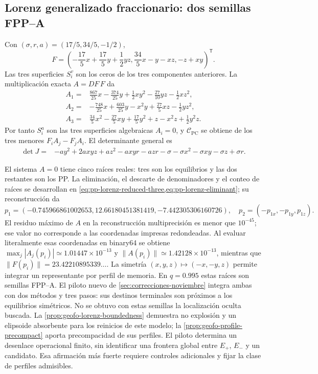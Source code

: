 \subsection{Lorenz generalizado fraccionario: dos semillas FPP--A}
\label{subsec:casegt-lorenz}

Con $(\sigma,r,a)=(17/5,34/5,-1/2)$,
\begin{equation}
 F=\left(
 -\frac{17}{5}x+\frac{17}{5}y+\frac12yz,
 \frac{34}{5}x-y-xz,
 -z+xy
 \right)^{\mathsf T}.
 \label{casegt:eq:lorenz-field}
\end{equation}
Las tres superficies $S_i^v$ son los ceros de los tres componentes anteriores.
La multiplicación exacta $A=DF\,F$ da
\begin{align}
 A_1={}&\frac{867}{25}x-\frac{374}{25}y+\frac{1}{2}xy^2
 -\frac{27}{10}yz-\frac12xz^2,\nonumber\\
 A_2={}&-\frac{748}{25}x+\frac{603}{25}y-x^2y
 +\frac{27}{5}xz-\frac12yz^2,\\
 A_3={}&\frac{34}{5}x^2-\frac{27}{5}xy+\frac{17}{5}y^2
 +z-x^2z+\frac12y^2z.
 \label{casegt:eq:lorenz-A}
\end{align}
Por tanto $S_i^a$ son las tres superficies algebraicas
$A_i=0$, y $\mathcal C_{\mathrm{PC}}$ se obtiene de los tres menores
$F_iA_j-F_jA_i$. El determinante general es
\begin{align}
 \det J={}&-ay^2+2axyz+az^2-axyr-azr-\sigma
 -\sigma x^2-\sigma xy-\sigma z+\sigma r.
 \label{casegt:eq:lorenz-det}
\end{align}

El sistema $A=0$ tiene cinco raíces reales: tres son los equilibrios y las dos restantes
son los PP. La eliminación, el descarte de denominadores y el conteo de
raíces se desarrollan en \cref{eq:pp-lorenz-reduced-three,eq:pp-lorenz-eliminant};
su reconstrucción da
\begin{equation}
 p_1=(-0.745966861002653,12.66180451381419,-7.442305306160726),
 \quad
 p_2=(-p_{1x},-p_{1y},p_{1z}).
 \label{casegt:eq:lorenz-PP}
\end{equation}
El residuo máximo de $A$ en la reconstrucción multiprecisión es menor que
$10^{-45}$; ese valor no corresponde a las coordenadas impresas redondeadas.
Al evaluar literalmente esas coordenadas en binary64 se obtiene
$\max_j|A_j(p_i)|\simeq1.01447\times10^{-13}$ y
$\lVert A(p_i)\rVert\simeq1.42128\times10^{-13}$, mientras que
$\lVert F(p_i)\rVert=23.42210895339\ldots$. La simetría
$(x,y,z)\mapsto(-x,-y,z)$ permite integrar un representante por perfil de
memoria. En $q=0.995$ estas raíces son semillas FPP--A. El piloto nuevo de
\cref{sec:correcciones-noviembre} integra ambas con dos métodos y tres
pasos: sus destinos terminales son próximos a los equilibrios simétricos.
No se obtuvo con estas semillas la localización oculta buscada.
La \cref{prop:geofo-lorenz-boundedness} demuestra
no explosión y un elipsoide absorbente para los reinicios de este modelo; la
\cref{prop:geofo-profile-precompact} aporta precompacidad de sus perfiles.
El piloto determina un desenlace operacional finito, sin identificar una
frontera global entre $E_+$, $E_-$ y un candidato. Esa afirmación más fuerte
requiere controles adicionales y fijar la clase de perfiles admisibles.

